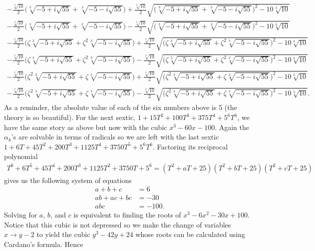 \documentclass[10pt,oneside,reqno]{amsart}
\begin{document}
\begin{flushleft}
		\begin{gather*}
			-\frac{\sqrt[3]{10}}{2}\Bigg(\sqrt[3]{-5+i\sqrt{55}}+\sqrt[3]{-5-i\sqrt{55}}\Bigg)+\frac{\sqrt[3]{10}}{2}\sqrt{\Bigg(\sqrt[3]{-5+i\sqrt{55}}+\sqrt[3]{-5-i\sqrt{55}}\Bigg)^2-10\sqrt[3]{10}} \\
			-\frac{\sqrt[3]{10}}{2}\Bigg(\sqrt[3]{-5+i\sqrt{55}}+\sqrt[3]{-5-i\sqrt{55}}\Bigg)-\frac{\sqrt[3]{10}}{2}\sqrt{\Bigg(\sqrt[3]{-5+i\sqrt{55}}+\sqrt[3]{-5-i\sqrt{55}}\Bigg)^2-10\sqrt[3]{10}} \\
			-\frac{\sqrt[3]{10}}{2}\Bigg(\zeta\sqrt[3]{-5+i\sqrt{55}}+\zeta^2\sqrt[3]{-5-i\sqrt{55}}\Bigg)+\frac{\sqrt[3]{10}}{2}\sqrt{\Bigg(\zeta\sqrt[3]{-5+i\sqrt{55}}+\zeta^2\sqrt[3]{-5-i\sqrt{55}}\Bigg)^2-10\sqrt[3]{10}} \\
			-\frac{\sqrt[3]{10}}{2}\Bigg(\zeta\sqrt[3]{-5+i\sqrt{55}}+\zeta^2\sqrt[3]{-5-i\sqrt{55}}\Bigg)-\frac{\sqrt[3]{10}}{2}\sqrt{\Bigg(\zeta\sqrt[3]{-5+i\sqrt{55}}+\zeta^2\sqrt[3]{-5-i\sqrt{55}}\Bigg)^2-10\sqrt[3]{10}} \\
			-\frac{\sqrt[3]{10}}{2}\Bigg(\zeta^2\sqrt[3]{-5+i\sqrt{55}}+\zeta\sqrt[3]{-5-i\sqrt{55}}\Bigg)+\frac{\sqrt[3]{10}}{2}\sqrt{\Bigg(\zeta^2\sqrt[3]{-5+i\sqrt{55}}+\zeta\sqrt[3]{-5-i\sqrt{55}}\Bigg)^2-10\sqrt[3]{10}} \\
			-\frac{\sqrt[3]{10}}{2}\Bigg(\zeta^2\sqrt[3]{-5+i\sqrt{55}}+\zeta\sqrt[3]{-5-i\sqrt{55}}\Bigg)-\frac{\sqrt[3]{10}}{2}\sqrt{\Bigg(\zeta^2\sqrt[3]{-5+i\sqrt{55}}+\zeta\sqrt[3]{-5-i\sqrt{55}}\Bigg)^2-10\sqrt[3]{10}}.
		\end{gather*}
		As a reminder, the absolute value of each of the six numbers above is 5 (the theory is so beautiful).  For the next sextic, $1+15T^2+100T^3+375T^4+5^6T^6$, we have the same story as above but now with the cubic $x^3-60x-100$.  Again the $\alpha_k$'s are solvable in terms of radicals so we are left with the last sextic $1+6T+45T^2+200T^3+1125T^4+3750T^5+5^6T^6$.  Factoring its reciprocal polynomial
		\begin{gather*}
			T^6+6T^5+45T^4+200T^3+1125T^2+3750T+5^6=(T^2+aT+25)(T^2+bT+25)(T^2+cT+25)
		\end{gather*}
		gives us the following system of equations
		\begin{align*}
			a+b+c & =6 \\
			ab+ac+bc & =-30 \\
			abc & =-100.
		\end{align*}
		Solving for $a$, $b$, and $c$ is equivalent to finding the roots of $x^3-6x^2-30x+100$.  Notice that this cubic is not depressed so we make the change of variables $x\rightarrow y-2$ to yield the cubic $y^3-42y+24$ whose roots can be calculated using Cardano's formula.  Hence

\end{flushleft}
\end{document}
